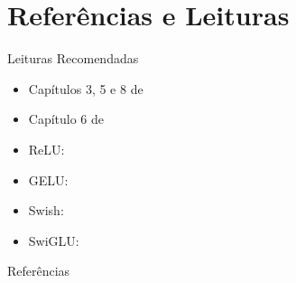 \documentclass[aspectratio=169,xcolor=dvipsnames]{beamer}
\begin{document}
  \section*{Referências e Leituras}
  \begin{frame}{Leituras Recomendadas}
    \leiturasize
    \begin{itemize}
      \item Capítulos 3, 5 e 8 de 
      \item Capítulo 6 de 
      \item ReLU: 
      \item GELU: 
      \item Swish: 
      \item SwiGLU: 
    \end{itemize}
  \end{frame}

  \begin{frame}[allowframebreaks]{Referências}
    \sloppy
    \printbibliography[heading=none]
  \end{frame}
\end{document}
